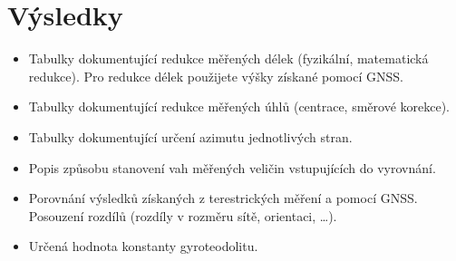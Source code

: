 \section{Výsledky}


\begin{itemize}
    \item Tabulky dokumentující redukce měřených délek (fyzikální, matematická redukce). 
          Pro redukce délek použijete výšky získané pomocí GNSS.
    \item Tabulky dokumentující redukce měřených úhlů (centrace, směrové korekce).
    \item Tabulky dokumentující určení azimutu jednotlivých stran.
    \item Popis způsobu stanovení vah měřených veličin vstupujících do vyrovnání.
    
    \item Porovnání výsledků získaných z terestrických měření a pomocí GNSS. 
          Posouzení rozdílů (rozdíly v rozměru sítě, orientaci, \ldots).
    
    \item Určená hodnota konstanty gyroteodolitu.
\end{itemize}

